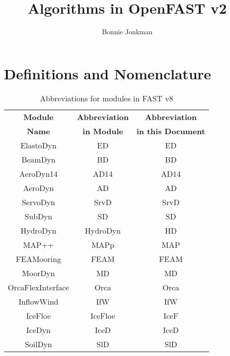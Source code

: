 \documentclass[10pt,letterpaper,oneside,notitlepage]{article}
\begin{document}
\title{Algorithms in OpenFAST v2}
\author{Bonnie Jonkman}
\maketitle


\section{Definitions and Nomenclature}


\begin{table}[h]
   \centering
      \begin{tabular}{c|c|c}
      \textbf{Module} & \textbf{Abbreviation} & \textbf{Abbreviation}\\
      \textbf{Name}   & \textbf{in Module}    & \textbf{in this Document}\\
      \hline 
      ElastoDyn          & ED                    & ED        \\
      BeamDyn            & BD                    & BD        \\
      AeroDyn14          & AD14                  & AD14      \\
      AeroDyn            & AD                    & AD        \\
      ServoDyn           & SrvD                  & SrvD      \\
      SubDyn             & SD                    & SD        \\
      HydroDyn           & HydroDyn              & HD        \\
      MAP++              & MAPp                  & MAP       \\
      FEAMooring         & FEAM                  & FEAM      \\
      MoorDyn            & MD                    & MD        \\
      OrcaFlexInterface  & Orca                  & Orca      \\
      InflowWind         & IfW                   & IfW       \\   
      IceFloe            & IceFloe               & IceF      \\   
      IceDyn             & IceD                  & IceD      \\   
      SoilDyn            & SlD                   & SlD       \\
      \end{tabular}
   \caption{Abbreviations for modules in FAST v8}
   \label{tab:Abbrev}
\end{table}
\end{document}
